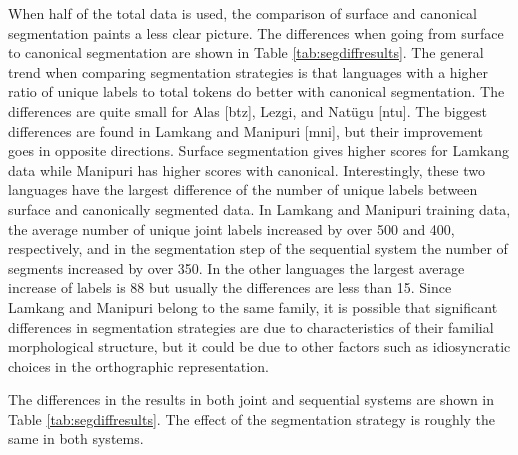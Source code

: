 When half of the total data is used, the comparison of surface and canonical segmentation paints a less clear picture. The differences when going from surface to canonical segmentation are shown in Table \ref{tab:segdiffresults}. The general trend when comparing segmentation strategies is that languages with a higher ratio of unique labels to total tokens do better with canonical segmentation. The differences are quite small for Alas [btz], Lezgi, and Nat\"ugu [ntu]. The biggest differences are found in Lamkang and Manipuri [mni], but their improvement goes in opposite directions. Surface segmentation gives higher scores for Lamkang data while Manipuri has higher scores with canonical. Interestingly, these two languages have the largest difference of the number of unique labels between surface and canonically segmented data. In Lamkang and Manipuri training data, the average number of unique joint labels increased by over 500 and 400, respectively, and in the segmentation step of the sequential system the number of segments increased by over 350. In the other languages the largest average increase of labels is 88 but usually the differences are less than 15. Since Lamkang and Manipuri belong to the same family, it is possible that significant differences in segmentation strategies are due to characteristics of their familial morphological structure, but it could be due to other factors such as idiosyncratic choices in the orthographic representation. 

The differences in the results in both joint and sequential systems are shown in Table \ref{tab:segdiffresults}. The effect of the segmentation strategy is roughly the same in both systems. 

